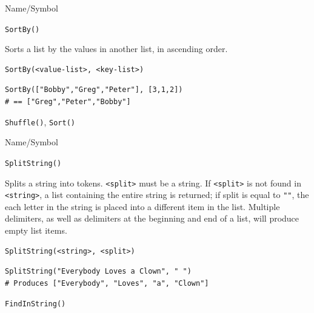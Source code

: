 \begin{desc}{Name/Symbol}
\item[Name/Symbol] 	\verb+SortBy()+

\item[Description] 	Sorts a list by the values in another list, in ascending
		order.

\item[Usage]
\begin{verbatim}
SortBy(<value-list>, <key-list>)
\end{verbatim}

\item[Example]
\begin{verbatim}
SortBy(["Bobby","Greg","Peter"], [3,1,2]) 
# == ["Greg","Peter","Bobby"]
\end{verbatim}

\item[See Also]    	\verb+Shuffle()+, \verb+Sort()+
\end{desc}

\begin{desc}{Name/Symbol}
\item[Name/Symbol]  	\verb+SplitString()+

\item[Description]	Splits a string into tokens. \verb+<split>+ must be a string. If 
		\verb+<split>+ is not found in \verb+<string>+, a list containing the entire 
		string is returned; if split is equal to \verb+""+, the each letter 
		in the string is placed into a different item in the list.  
		Multiple delimiters, as well as delimiters at the beginning 
		and end of a list, will produce empty list items. 


\item[Usage]
\begin{verbatim}
SplitString(<string>, <split>)
\end{verbatim}

\item[Example]      	
\begin{verbatim}
SplitString("Everybody Loves a Clown", " ") 
# Produces ["Everybody", "Loves", "a", "Clown"]
\end{verbatim}

\item[See Also]     	\verb+FindInString()+
\end{desc}




